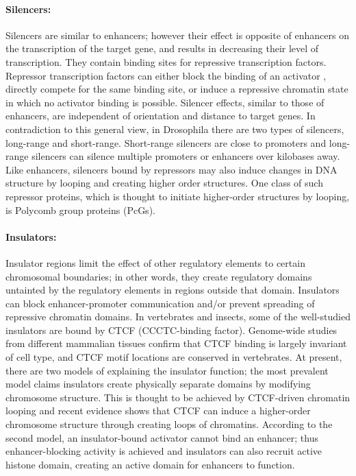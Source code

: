 \documentclass[12pt,]{krantz}
\let\oldparagraph\paragraph
\renewcommand{\paragraph}[1]{\oldparagraph{#1}\mbox{}}
\theoremstyle{definition}
\theoremstyle{definition}
\theoremstyle{definition}
\theoremstyle{remark}
\begin{document}
\hypertarget{silencers}{%
\paragraph{Silencers:}\label{silencers}}

Silencers are similar to enhancers; however their effect is opposite of
enhancers on the transcription of the target gene, and results in
decreasing their level of transcription. They contain binding sites for
repressive transcription factors. Repressor transcription factors can
either block the binding of an activator , directly compete for the same
binding site, or induce a repressive chromatin state in which no
activator binding is possible. Silencer effects, similar to those of
enhancers, are independent of orientation and distance to target genes.
In contradiction to this general view, in Drosophila there are two types
of silencers, long-range and short-range. Short-range silencers are
close to promoters and long-range silencers can silence multiple
promoters or enhancers over kilobases away. Like enhancers, silencers
bound by repressors may also induce changes in DNA structure by looping
and creating higher order structures. One class of such repressor
proteins, which is thought to initiate higher-order structures by
looping, is Polycomb group proteins (PcGs).

\hypertarget{insulators}{%
\paragraph{Insulators:}\label{insulators}}

Insulator regions limit the effect of other regulatory elements to
certain chromosomal boundaries; in other words, they create regulatory
domains untainted by the regulatory elements in regions outside that
domain. Insulators can block enhancer-promoter communication and/or
prevent spreading of repressive chromatin domains. In vertebrates and
insects, some of the well-studied insulators are bound by CTCF
(CCCTC-binding factor). Genome-wide studies from different mammalian
tissues confirm that CTCF binding is largely invariant of cell type, and
CTCF motif locations are conserved in vertebrates. At present, there are
two models of explaining the insulator function; the most prevalent
model claims insulators create physically separate domains by modifying
chromosome structure. This is thought to be achieved by CTCF-driven
chromatin looping and recent evidence shows that CTCF can induce a
higher-order chromosome structure through creating loops of chromatins.
According to the second model, an insulator-bound activator cannot bind
an enhancer; thus enhancer-blocking activity is achieved and insulators
can also recruit active histone domain, creating an active domain for
enhancers to function.
\end{document}
